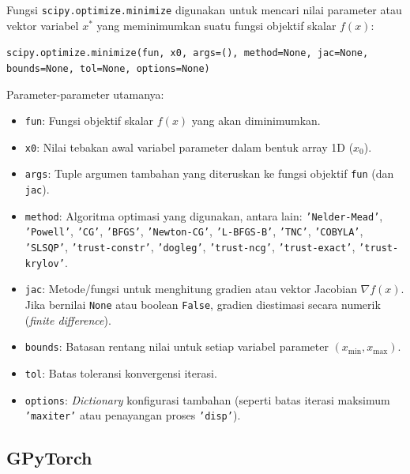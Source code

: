 \documentclass[11pt,a4paper]{article}
\def\mathbf#1{#1}%
\begin{document}
\noindent Fungsi \texttt{scipy.optimize.minimize} digunakan untuk mencari nilai parameter atau vektor variabel $\mathbf{x}^*$ yang meminimumkan suatu fungsi objektif skalar $f(\mathbf{x})$:
\begin{center}
\texttt{scipy.optimize.minimize(fun, x0, args=(), method=None, jac=None, bounds=None, tol=None, options=None)}
\end{center}
\noindent Parameter-parameter utamanya:
\begin{itemize}
    \item \texttt{fun}: Fungsi objektif skalar $f(\mathbf{x})$ yang akan diminimumkan.
    \item \texttt{x0}: Nilai tebakan awal variabel parameter dalam bentuk array 1D ($\mathbf{x}_0$).
    \item \texttt{args}: Tuple argumen tambahan yang diteruskan ke fungsi objektif \texttt{fun} (dan \texttt{jac}).
    \item \texttt{method}: Algoritma optimasi yang digunakan, antara lain: \texttt{'Nelder-Mead'}, \texttt{'Powell'}, \texttt{'CG'}, \texttt{'BFGS'}, \texttt{'Newton-CG'}, \texttt{'L-BFGS-B'}, \texttt{'TNC'}, \texttt{'COBYLA'}, \texttt{'SLSQP'}, \texttt{'trust-constr'}, \texttt{'dogleg'}, \texttt{'trust-ncg'}, \texttt{'trust-exact'}, \texttt{'trust-krylov'}.
    \item \texttt{jac}: Metode/fungsi untuk menghitung gradien atau vektor Jacobian $\nabla f(\mathbf{x})$. Jika bernilai \texttt{None} atau boolean \texttt{False}, gradien diestimasi secara numerik (\textit{finite difference}).
    \item \texttt{bounds}: Batasan rentang nilai untuk setiap variabel parameter $(x_{\min}, x_{\max})$.
    \item \texttt{tol}: Batas toleransi konvergensi iterasi.
    \item \texttt{options}: \textit{Dictionary} konfigurasi tambahan (seperti batas iterasi maksimum \texttt{'maxiter'} atau penayangan proses \texttt{'disp'}).
\end{itemize}

\subsection{GPyTorch}
\label{subsec:gpytorch}
\end{document}
